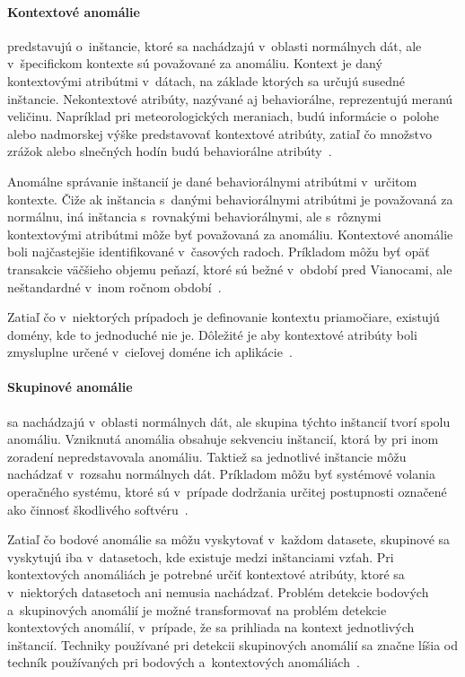 \documentclass[a4paper,twoside,slovak,12pt]{article}
\begin{document}
\paragraph{Kontextové anomálie} predstavujú o~inštancie, ktoré sa nachádzajú
v~oblasti normálnych dát, ale v~špecifickom kontexte sú považované za anomáliu.
Kontext je daný kontextovými atribútmi v~dátach, na základe ktorých sa určujú
susedné inštancie. Nekontextové atribúty, nazývané aj behaviorálne, reprezentujú
meranú veličinu. Napríklad pri meteorologických meraniach, budú informácie
o~polohe alebo nadmorskej výške predstavovať kontextové atribúty, zatiaľ čo
množstvo zrážok alebo slnečných hodín budú behaviorálne
atribúty~\cite{Chandola2009}.

Anomálne správanie inštancií je dané behaviorálnymi atribútmi v~určitom kontexte.
Čiže ak inštancia s~danými behaviorálnymi atribútmi je považovaná za normálnu,
iná inštancia s~rovnakými behaviorálnymi, ale s~rôznymi kontextovými atribútmi
môže byť považovaná za anomáliu. Kontextové anomálie boli najčastejšie
identifikované v~časových radoch. Príkladom môžu byť opäť transakcie väčšieho
objemu peňazí, ktoré sú bežné v~období pred Vianocami, ale neštandardné v~inom
ročnom období~\cite{Chandola2009}.

Zatiaľ čo v~niektorých prípadoch je definovanie kontextu priamočiare, existujú
domény, kde to jednoduché nie je. Dôležité je aby kontextové atribúty boli
zmysluplne určené v~cieľovej doméne ich aplikácie~\cite{Chandola2009}.

\paragraph{Skupinové anomálie} sa nachádzajú v~oblasti normálnych dát, ale
skupina týchto inštancií tvorí spolu anomáliu. Vzniknutá anomália obsahuje
sekvenciu inštancií, ktorá by pri inom zoradení nepredstavovala anomáliu.
Taktiež sa jednotlivé inštancie môžu nachádzať v~rozsahu normálnych dát.
Príkladom môžu byť systémové volania operačného systému, ktoré sú v~prípade
dodržania určitej postupnosti označené ako činnosť škodlivého
softvéru~\cite{Chandola2009}.

Zatiaľ čo bodové anomálie sa môžu vyskytovať v~každom datasete, skupinové sa
vyskytujú iba v~datasetoch, kde existuje medzi inštanciami vzťah. Pri
kontextových anomáliách je potrebné určiť kontextové atribúty, ktoré sa
v~niektorých datasetoch ani nemusia nachádzať. Problém detekcie bodových
a~skupinových anomálií je možné transformovať na problém detekcie kontextových
anomálií, v~prípade, že sa prihliada na kontext jednotlivých inštancií. Techniky
používané pri detekcii skupinových anomálií sa značne líšia od techník
používaných pri bodových a~kontextových anomáliách~\cite{Chandola2009}.
\end{document}
